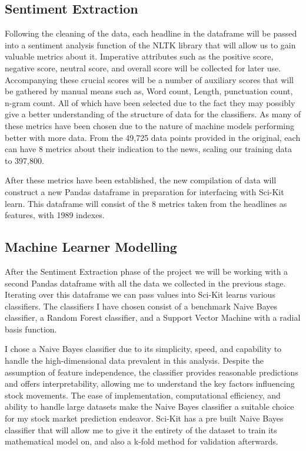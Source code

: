 \documentclass[11pt, a4paper]{article}
\begin{document}
\subsection{Sentiment Extraction}
Following the cleaning of the data, each headline in the dataframe will be passed into a sentiment analysis function of the NLTK library that will allow us to gain valuable metrics about it. Imperative attributes such as the positive score, negative score, neutral score, and overall score will be collected for later use. Accompanying these crucial scores will be a number of auxiliary scores that will be gathered by manual means such as,  Word count, Length, punctuation count, n-gram count. All of which have been selected due to the fact they may possibly give a better understanding of the structure of data for the classifiers. As many of these metrics have been chosen due to the nature of machine models performing better with more data. From the 49,725 data points provided in the original, each can have 8 metrics about their indication to the news, scaling our training data to 397,800.

After these metrics have been established, the new compilation of data will construct a new Pandas dataframe in preparation for interfacing with Sci-Kit learn. This dataframe will consist of the 8 metrics taken from the headlines as features, with 1989 indexes.
\subsection{Machine Learner Modelling}
After the Sentiment Extraction phase of the project we will be working with a second Pandas dataframe with all the data we collected in the previous stage. Iterating over this dataframe we can pass values into Sci-Kit learns various classifiers. The classifiers I have chosen consist of a benchmark Naive Bayes classifier, a Random Forest classifier, and a Support Vector Machine with a radial basis function.

I chose a Naive Bayes classifier due to its simplicity, speed, and capability to handle the high-dimensional data prevalent in this analysis. Despite the assumption of feature independence, the classifier provides reasonable predictions and offers interpretability, allowing me to understand the key factors influencing stock movements. The ease of implementation, computational efficiency, and ability to handle large datasets make the Naive Bayes classifier a suitable choice for my stock market prediction endeavor. Sci-Kit has a pre built Naive Bayes classifier that will allow me to give it the entirety of the dataset to train its mathematical model on, and also a k-fold method for validation afterwards. 
\end{document}
